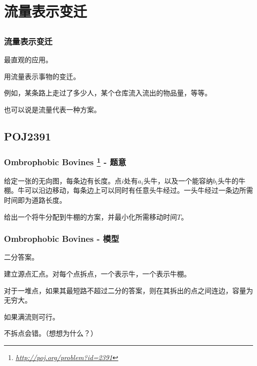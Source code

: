 \documentclass[9pt,dvipsnames,table]{beamer}
\newcommand{\hlink}[1]{
	\footnote{\fontsize{6pt}{\baselineskip}\href{#1}{\textsl{\underline{#1}}}}
}
\begin{document}
\section[Model I]{流量表示变迁}
\subsection{}
\begin{frame}
	\frametitle{流量表示变迁}
	最直观的应用。
	
	用流量表示事物的变迁。
	
	例如，某条路上走过了多少人，某个仓库流入流出的物品量，等等。\pause
	
	也可以说是流量代表一种方案。
\end{frame}

\subsection{POJ2391}
\begin{frame}
	\frametitle{Ombrophobic Bovines\hlink{http://poj.org/problem?id=2391} - 题意}
	给定一张的无向图，每条边有长度。点$i$处有$a_i$头牛，以及一个能容纳$b_i$头牛的牛棚。牛可以沿边移动，每条边上可以同时有任意头牛经过。一头牛经过一条边所需时间即为道路长度。
	
	给出一个将牛分配到牛棚的方案，并最小化所需移动时间$T$。
\end{frame}
\begin{frame}
	\frametitle{Ombrophobic Bovines - 模型}
	二分答案。\pause
	
	建立源点汇点。对每个点拆点，一个表示牛，一个表示牛棚。\pause
	
	对于一堆点，如果其最短路不超过二分的答案，则在其拆出的点之间连边，容量为无穷大。
	
	如果满流则可行。\pause
	
	不拆点会错。（想想为什么？）
\end{frame}
\end{document}
